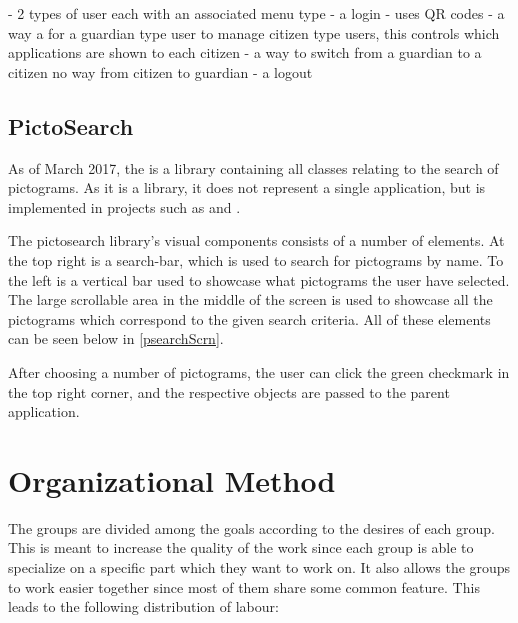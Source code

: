 - 2 types of user each with an associated menu type
- a login - uses QR codes
- a way a for a guardian type user to manage citizen type users, this
controls which applications are shown to each citizen
- a way to switch from a guardian to a citizen no way from citizen to guardian
- a logout


\subsection{PictoSearch}
As of March 2017, the  is a library containing all
classes relating to the search of pictograms. As it is a library, it does not
represent a single application, but is implemented in projects such as
 and .\nl

The pictosearch library's visual components consists of a number of
elements. At the top right is a search-bar, which is used to search for
pictograms by name. To the left is a vertical bar used to showcase what
pictograms the user have selected. The large scrollable area in the middle of
the screen is used to showcase all the pictograms which correspond to the given
search criteria. All of these elements can be seen below in
\autoref{psearchScrn}.
 

After choosing a number of pictograms, the user can click the green checkmark in
the top right corner, and the respective  objects are passed to
the parent application.

\section{Organizational Method}

The groups are divided among the goals according to the desires of each group.
This is meant to increase the quality of the work since each group is able to
specialize on a specific part which they want to work on. It also allows the
groups to work easier together since most of them share some common feature.
This leads to the following distribution of labour:

